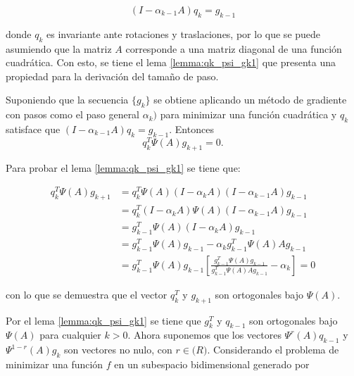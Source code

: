 \begin{equation*}
    (I-\alpha_{k-1}A)q_k = g_{k-1}
	\label{eq:qdef}
\end{equation*}

donde $q_k$ es invariante ante rotaciones y traslaciones, por lo que se puede asumiendo que la matriz $A$ corresponde a una matriz diagonal de una función cuadrática. Con esto, se tiene el lema \ref{lemma:qk_psi_gk1} que presenta una propiedad para la derivación del tamaño de paso.

\begin{lema}
    Suponiendo que la secuencia $\{g_k\}$ se obtiene aplicando un método de gradiente con pasos como el paso general $\alpha_k)$ para minimizar una función cuadrática y $q_k$ satisface que $(I-\alpha_{k-1}A)q_k = g_{k-1}$. Entonces
    \begin{equation*}
        q_k^T\Psi(A)g_{k+1} = 0.
    \end{equation*}
    \label{lemma:qk_psi_gk1}
\end{lema}

Para probar el lema \ref{lemma:qk_psi_gk1} se tiene que:

\begin{align*}
    q_k^T \Psi(A)g_{k+1} & = q_k^T\Psi(A)(I-\alpha_kA)(I-\alpha_{k-1}A)g_{k-1}                                                        \\
                         & = q_k^T(I-\alpha_kA)\Psi(A)(I-\alpha_{k-1}A)g_{k-1}                                                        \\
                         & = g_{k-1}^T\Psi(A)(I-\alpha_kA)g_{k-1}                                                                     \\
                         & =g_{k-1}^T\Psi(A)g_{k-1}-\alpha_kg_{k-1}^T\Psi(A)Ag_{k-1}                                                  \\
                         & =g_{k-1}^T\Psi(A)g_{k-1}\left[\frac{g_{k-1}^T\Psi(A)g_{k-1}}{g_{k-1}^T\Psi(A)Ag_{k-1}}-\alpha_k\right] = 0
\end{align*}

con lo que se demuestra que el vector $q_k^T$ y $g_{k+1}$ son ortogonales bajo $\Psi(A)$.

Por el lema \ref{lemma:qk_psi_gk1} se tiene que $g_k^T$  y $q_{k-1}$ son ortogonales bajo $\Psi(A)$ para cualquier $k>0$. Ahora suponemos que los vectores $\Psi^r(A)q_{k-1}$ y $\Psi^{1-r}(A)g_k$ son vectores no nulo, con $r\in\mathbb(R)$. Considerando el problema de minimizar una función $f$ en un subespacio bidimensional generado por

